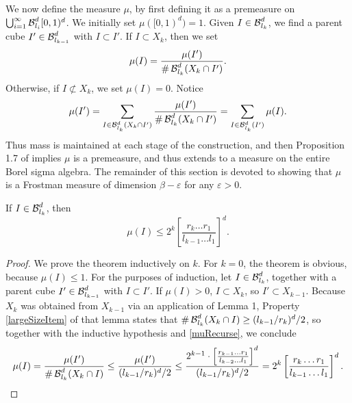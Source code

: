 We now define the measure $\mu$, by first defining it as a premeasure on $\bigcup_{i = 1}^\infty \operatorname{\mathcal{B}}^d_{l_i}[0,1)^d$. We initially set $\mu([0,1)^d) = 1$. Given $I \in \operatorname{\mathcal{B}}^d_{l_k}$, we find a parent cube $I' \in \operatorname{\mathcal{B}}^d_{l_{k-1}}$ with $I \subset I'$. If $I \subset X_k$, then we set
%
\begin{equation} \label{muRecurse} \mu(I) = \frac{\mu(I')}{\# \operatorname{\mathcal{B}}^d_{l_k}(X_k \cap I')}. \end{equation}
%
Otherwise, if $I \not \subset X_k$, we set $\mu(I) = 0$. Notice
%
\[ \mu(I') = \sum_{I \in \operatorname{\mathcal{B}}^d_{l_k}(X_k \cap I')} \frac{\mu(I')}{\# \operatorname{\mathcal{B}}^d_{l_k}(X_k \cap I')} = \sum_{I \in \operatorname{\mathcal{B}}^d_{l_k}(I')} \mu(I). \]
%
Thus mass is maintained at each stage of the construction, and then Proposition 1.7 of \cite{Falconer} implies $\mu$ is a premeasure, and thus extends to a measure on the entire Borel sigma algebra. The remainder of this section is devoted to showing that $\mu$ is a Frostman measure of dimension $\beta - \varepsilon$ for any $\varepsilon > 0$.


\begin{lemma} \label{muBoundLemma}
	If $I \in \operatorname{\mathcal{B}}^d_{l_k}$, then
	\begin{equation} \label{muBound}
		\mu(I) \leq 2^k \left[ \frac{r_k \dots r_1}{l_{k-1} \dots l_1} \right]^d.
	\end{equation}
\end{lemma}
\begin{proof}
	We prove the theorem inductively on $k$. For $k = 0$, the theorem is obvious, because $\mu(I) \leq 1$. For the purposes of induction, let $I \in \operatorname{\mathcal{B}}^d_{l_k}$, together with a parent cube $I' \in \operatorname{\mathcal{B}}^d_{l_{k-1}}$ with $I \subset I'$. If $\mu(I) > 0$, $I \subset X_k$, so $I' \subset X_{k-1}$. Because $X_k$ was obtained from $X_{k-1}$ via an application of Lemma 1, Property \ref{largeSizeItem} of that lemma states that $\# \operatorname{\mathcal{B}}^d_{l_k}(X_k \cap I) \geq (l_{k-1}/r_k)^d/2$, so together with the inductive hypothesis and \eqref{muRecurse}, we conclude
	\[ \mu(I) = \frac{\mu(I')}{\# \operatorname{\mathcal{B}}^d_{l_k}(X_k \cap I)} \leq \frac{\mu(I')}{(l_{k-1}/r_k)^d/2} \leq \frac{2^{k-1} \cdot \left[ \frac{r_{k-1} \dots r_1}{l_{k-2} \dots l_1} \right]^d}{(l_{k-1}/r_k)^d/2} = 2^k \left[ \frac{r_k \dots r_1}{l_{k-1} \dots l_1} \right]^d. \qedhere \]
\end{proof}

